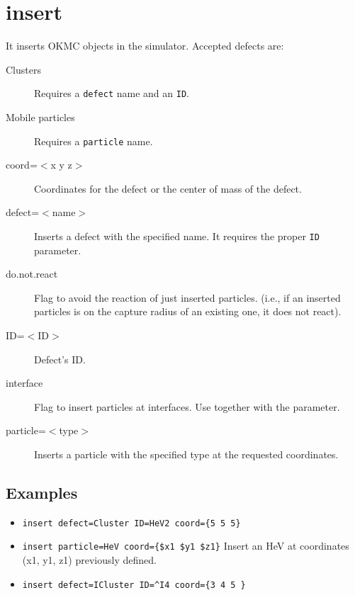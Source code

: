 \section{insert}

It inserts OKMC objects in the simulator.
Accepted defects are:
\begin{description}
\item[Clusters] Requires a {\tt defect} name and an {\tt ID}.
\item[Mobile particles] Requires a {\tt particle} name.
\end{description}

\begin{description}
\item [coord=$<$x y z$>$] Coordinates for the defect or the center of mass of the defect.
\item [defect=$<$name$>$] Inserts a defect with the specified name. It requires the proper {\tt ID} parameter.
\item [do.not.react] Flag to avoid the reaction of just inserted particles. (i.e., if an inserted particles is on the capture radius of an existing one, it does not react).
\item [ID=$<$ID$>$] Defect's ID.
\item [interface] Flag to insert particles at interfaces. Use together with the  parameter.
\item [particle=$<$type$>$] Inserts a particle with the specified type at the requested coordinates.
\end{description}

\subsection{Examples}
\begin{itemize}
\item \verb+insert defect=Cluster ID=HeV2 coord={5 5 5}+
\item \verb+insert particle=HeV coord={$x1 $y1 $z1}+ Insert an HeV at coordinates (x1, y1, z1) previously defined.
\item \verb+insert defect=ICluster ID=^I4 coord={3 4 5 }+
\end{itemize}
